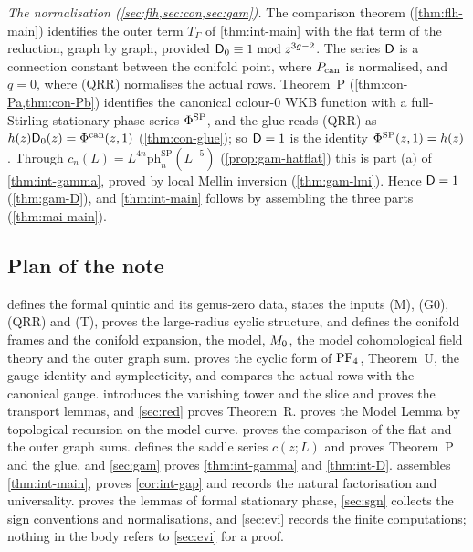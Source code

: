 \emph{The normalisation (\cref{sec:flh,sec:con,sec:gam}).} The comparison theorem (\cref{thm:flh-main}) identifies the outer term $T_\Gamma$ of \cref{thm:int-main} with the flat term of the reduction, graph by graph, provided $\mathsf{D}_0\equiv1\bmod z^{3g-2}$. The series $\mathsf{D}$ is a connection constant between the conifold point, where $P_{\mathrm{can}}$ is normalised, and $q=0$, where (QRR) normalises the actual rows. Theorem~P (\cref{thm:con-Pa,thm:con-Pb}) identifies the canonical colour-$0$ WKB function with a full-Stirling stationary-phase series $\Phi^{\mathrm{SP}}$, and the glue reads (QRR) as $h(z)\mathsf{D}_0(z)=\Phi^{\mathrm{can}}(z,1)$ (\cref{thm:con-glue}); so $\mathsf{D}=1$ is the identity $\Phi^{\mathrm{SP}}(z,1)=h(z)$. Through $c_n(L)=L^{4n}\mathrm{ph}^{\mathrm{SP}}_n(L^{-5})$ (\cref{prop:gam-hatflat}) this is part (a) of \cref{thm:int-gamma}, proved by local Mellin inversion (\cref{thm:gam-lmi}). Hence $\mathsf{D}=1$ (\cref{thm:gam-D}), and \cref{thm:int-main} follows by assembling the three parts (\cref{thm:mai-main}).

\subsection{Plan of the note}
\label{sec:int-plan}

 defines the formal quintic and its genus-zero data, states the inputs (M), (G0), (QRR) and (T), proves the large-radius cyclic structure, and defines the conifold frames and the conifold expansion, the model, $M_{0}$, the model cohomological field theory and the outer graph sum.  proves the cyclic form of $\mathrm{PF}_{4}$, Theorem~U, the gauge identity and symplecticity, and compares the actual rows with the canonical gauge.  introduces the vanishing tower and the slice and proves the transport lemmas, and \cref{sec:red} proves Theorem~R.  proves the Model Lemma by topological recursion on the model curve.  proves the comparison of the flat and the outer graph sums.  defines the saddle series $c(z;L)$ and proves Theorem~P and the glue, and \cref{sec:gam} proves \cref{thm:int-gamma} and \cref{thm:int-D}.  assembles \cref{thm:int-main}, proves \cref{cor:int-gap} and records the natural factorisation and universality.  proves the lemmas of formal stationary phase, \cref{sec:sgn} collects the sign conventions and normalisations, and \cref{sec:evi} records the finite computations; nothing in the body refers to \cref{sec:evi} for a proof.
